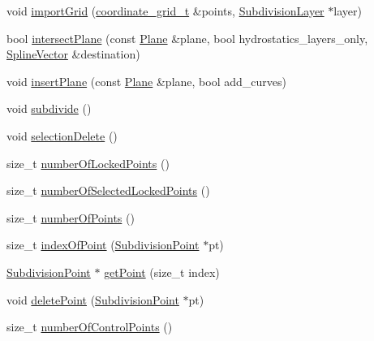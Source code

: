 \begin{DoxyCompactItemize}
\item 
void \hyperlink{classShipCAD_1_1SubdivisionSurface_aa193fd28425e9846908479615e7c5bf9}{import\-Grid} (\hyperlink{classShipCAD_1_1SubdivisionSurface_a8ed657cb7d4cd34662bd2d3e949d3e3b}{coordinate\-\_\-grid\-\_\-t} \&points, \hyperlink{classShipCAD_1_1SubdivisionLayer}{Subdivision\-Layer} $\ast$layer)
\item 
bool \hyperlink{classShipCAD_1_1SubdivisionSurface_a86961ff2a6421d778814c013c3d2b8d7}{intersect\-Plane} (const \hyperlink{classShipCAD_1_1Plane}{Plane} \&plane, bool hydrostatics\-\_\-layers\-\_\-only, \hyperlink{namespaceShipCAD_a053b941b2c87049bb9380428d4d5a056}{Spline\-Vector} \&destination)
\item 
void \hyperlink{classShipCAD_1_1SubdivisionSurface_ada26b740ea1f317763b6ecd372f13ea2}{insert\-Plane} (const \hyperlink{classShipCAD_1_1Plane}{Plane} \&plane, bool add\-\_\-curves)
\item 
void \hyperlink{classShipCAD_1_1SubdivisionSurface_ad9970c667fa8e33ff8b35eb6a48b6a2e}{subdivide} ()
\item 
void \hyperlink{classShipCAD_1_1SubdivisionSurface_a99bda5b49300775eda1df60451412686}{selection\-Delete} ()
\item 
size\-\_\-t \hyperlink{classShipCAD_1_1SubdivisionSurface_a771f0f1881a2da57dde8cb88a8fc9059}{number\-Of\-Locked\-Points} ()
\item 
size\-\_\-t \hyperlink{classShipCAD_1_1SubdivisionSurface_a2583bc0013b5725ac0902062d1c8bcea}{number\-Of\-Selected\-Locked\-Points} ()
\item 
size\-\_\-t \hyperlink{classShipCAD_1_1SubdivisionSurface_a404ffc0c4d13a3a00edb83ad439ee59e}{number\-Of\-Points} ()
\item 
size\-\_\-t \hyperlink{classShipCAD_1_1SubdivisionSurface_a1bde01d6b5972c302ad387cf1247f0fa}{index\-Of\-Point} (\hyperlink{classShipCAD_1_1SubdivisionPoint}{Subdivision\-Point} $\ast$pt)
\item 
\hyperlink{classShipCAD_1_1SubdivisionPoint}{Subdivision\-Point} $\ast$ \hyperlink{classShipCAD_1_1SubdivisionSurface_af07192c8cfc3429ad6da80a1da802a6c}{get\-Point} (size\-\_\-t index)
\item 
void \hyperlink{classShipCAD_1_1SubdivisionSurface_a4117039bfd819cb28ab5cb04296fdcd7}{delete\-Point} (\hyperlink{classShipCAD_1_1SubdivisionPoint}{Subdivision\-Point} $\ast$pt)
\item 
size\-\_\-t \hyperlink{classShipCAD_1_1SubdivisionSurface_a4e184650893ca2ac7e367778ec70c45f}{number\-Of\-Control\-Points} ()
\item 

\end{DoxyCompactItemize}
